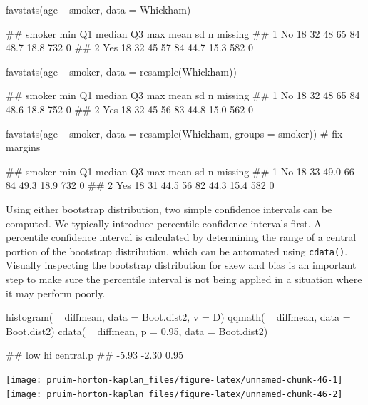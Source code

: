 \begin{Schunk}
\begin{Sinput}
favstats(age ~ smoker, data = Whickham)
\end{Sinput}
\begin{Soutput}
##   smoker min Q1 median Q3 max mean   sd   n missing
## 1     No  18 32     48 65  84 48.7 18.8 732       0
## 2    Yes  18 32     45 57  84 44.7 15.3 582       0
\end{Soutput}
\begin{Sinput}
favstats(age ~ smoker, data = resample(Whickham))
\end{Sinput}
\begin{Soutput}
##   smoker min Q1 median Q3 max mean   sd   n missing
## 1     No  18 32     48 65  84 48.6 18.8 752       0
## 2    Yes  18 32     45 56  83 44.8 15.0 562       0
\end{Soutput}
\begin{Sinput}
favstats(age ~ smoker, data = resample(Whickham, groups = smoker))  # fix margins
\end{Sinput}
\begin{Soutput}
##   smoker min Q1 median Q3 max mean   sd   n missing
## 1     No  18 33   49.0 66  84 49.3 18.9 732       0
## 2    Yes  18 31   44.5 56  82 44.3 15.4 582       0
\end{Soutput}
\end{Schunk}

Using either bootstrap distribution, two simple confidence intervals can
be computed. We typically introduce percentile confidence intervals
first. A percentile confidence interval is calculated by determining the
range of a central portion of the bootstrap distribution, which can be
automated using \texttt{cdata()}. Visually inspecting the bootstrap
distribution for skew and bias is an important step to make sure the
percentile interval is not being applied in a situation where it may
perform poorly.

\begin{Schunk}
\begin{Sinput}
histogram( ~ diffmean, data = Boot.dist2, v = D)
qqmath( ~ diffmean, data = Boot.dist2)
cdata( ~ diffmean, p = 0.95, data = Boot.dist2)
\end{Sinput}
\begin{Soutput}
##       low        hi central.p 
##     -5.93     -2.30      0.95
\end{Soutput}


\begin{center}\texttt{[image: pruim-horton-kaplan\_files/figure-latex/unnamed-chunk-46-1]} \texttt{[image: pruim-horton-kaplan\_files/figure-latex/unnamed-chunk-46-2]} \end{center}

\end{Schunk}

